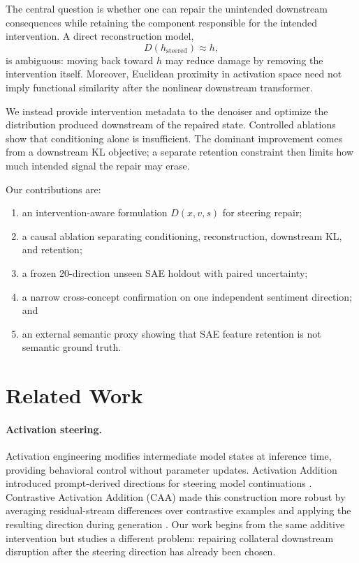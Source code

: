 \documentclass[11pt,twocolumn]{article}
\begin{document}
The central question is whether one can repair the unintended downstream consequences while retaining the component responsible for the intended intervention. A direct reconstruction model,
\begin{equation}
  D(h_{\mathrm{steered}}) \approx h,
\end{equation}
is ambiguous: moving back toward $h$ may reduce damage by removing the intervention itself. Moreover, Euclidean proximity in activation space need not imply functional similarity after the nonlinear downstream transformer.

We instead provide intervention metadata to the denoiser and optimize the distribution produced downstream of the repaired state. Controlled ablations show that conditioning alone is insufficient. The dominant improvement comes from a downstream KL objective; a separate retention constraint then limits how much intended signal the repair may erase.

Our contributions are:
\begin{enumerate}
  \item an intervention-aware formulation $D(x,v,s)$ for steering repair;
  \item a causal ablation separating conditioning, reconstruction, downstream KL, and retention;
  \item a frozen 20-direction unseen SAE holdout with paired uncertainty;
  \item a narrow cross-concept confirmation on one independent sentiment direction; and
  \item an external semantic proxy showing that SAE feature retention is not semantic ground truth.
\end{enumerate}

\section{Related Work}
\paragraph{Activation steering.}
Activation engineering modifies intermediate model states at inference time, providing behavioral control without parameter updates. Activation Addition introduced prompt-derived directions for steering model continuations \citep{turner2023activation}. Contrastive Activation Addition (CAA) made this construction more robust by averaging residual-stream differences over contrastive examples and applying the resulting direction during generation \citep{rimsky2024caa}. Our work begins from the same additive intervention but studies a different problem: repairing collateral downstream disruption after the steering direction has already been chosen.
\end{document}
